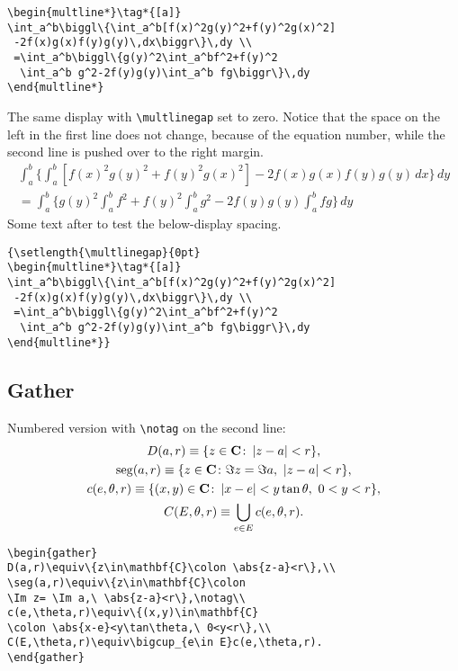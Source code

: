 \documentclass{article}
\theoremstyle{definition}
\theoremstyle{remark}
\DeclareMathOperator{\seg}{seg}
\newcommand{\envert}[1]{\left\lvert#1\right\rvert}
\let\abs=\envert
\begin{document}
\begin{verbatim}
\begin{multline*}\tag*{[a]}
\int_a^b\biggl\{\int_a^b[f(x)^2g(y)^2+f(y)^2g(x)^2]
 -2f(x)g(x)f(y)g(y)\,dx\biggr\}\,dy \\
 =\int_a^b\biggl\{g(y)^2\int_a^bf^2+f(y)^2
  \int_a^b g^2-2f(y)g(y)\int_a^b fg\biggr\}\,dy
\end{multline*}
\end{verbatim}


The same display with \verb=\multlinegap= set to zero.
Notice that the space on the left in
the first line does not change, because of the equation number, while
the second line is pushed over to the right margin.
{\setlength{\multlinegap}{0pt}
\begin{multline*}\tag*{[a]}
\int_a^b\biggl\{\int_a^b[f(x)^2g(y)^2+f(y)^2g(x)^2]
 -2f(x)g(x)f(y)g(y)\,dx\biggr\}\,dy \\
 =\int_a^b\biggl\{g(y)^2\int_a^bf^2+f(y)^2
  \int_a^b g^2-2f(y)g(y)\int_a^b fg\biggr\}\,dy
\end{multline*}}%
Some text after to test the below-display spacing.

\begin{verbatim}
{\setlength{\multlinegap}{0pt}
\begin{multline*}\tag*{[a]}
\int_a^b\biggl\{\int_a^b[f(x)^2g(y)^2+f(y)^2g(x)^2]
 -2f(x)g(x)f(y)g(y)\,dx\biggr\}\,dy \\
 =\int_a^b\biggl\{g(y)^2\int_a^bf^2+f(y)^2
  \int_a^b g^2-2f(y)g(y)\int_a^b fg\biggr\}\,dy
\end{multline*}}
\end{verbatim}
\fi %


\newpage
\subsection{Gather}
Numbered version with \verb;\notag; on the second line:
\begin{gather}
D(a,r)\equiv\{z\in\mathbf{C}\colon \abs{z-a}<r\},\\
\seg(a,r)\equiv\{z\in\mathbf{C}\colon
\Im z= \Im a,\ \abs{z-a}<r\},\notag\\
c(e,\theta,r)\equiv\{(x,y)\in\mathbf{C}
\colon \abs{x-e}<y\tan\theta,\ 0<y<r\},\\
C(E,\theta,r)\equiv\bigcup_{e\in E}c(e,\theta,r).
\end{gather}
\begin{verbatim}
\begin{gather}
D(a,r)\equiv\{z\in\mathbf{C}\colon \abs{z-a}<r\},\\
\seg(a,r)\equiv\{z\in\mathbf{C}\colon
\Im z= \Im a,\ \abs{z-a}<r\},\notag\\
c(e,\theta,r)\equiv\{(x,y)\in\mathbf{C}
\colon \abs{x-e}<y\tan\theta,\ 0<y<r\},\\
C(E,\theta,r)\equiv\bigcup_{e\in E}c(e,\theta,r).
\end{gather}
\end{verbatim}
\end{document}
